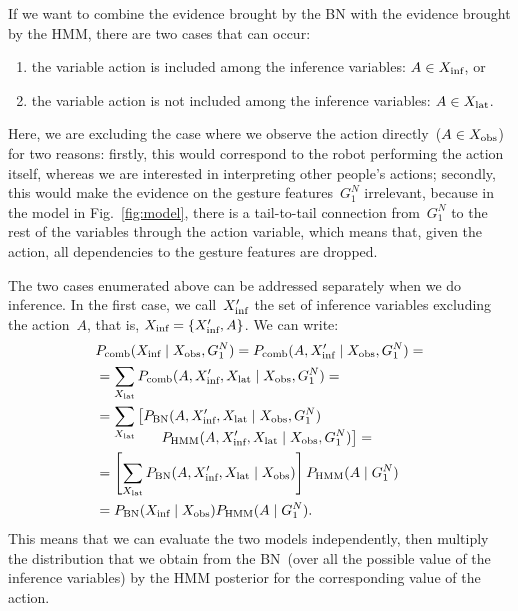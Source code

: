 If we want to combine the evidence brought by the \ac{BN} with the evidence brought by the \ac{HMM}, there are two cases that can occur:
\begin{enumerate}
\item the variable action is included among the inference variables: $A \in X_\text{inf}$, or

\item the variable action is not included among the inference variables: $A \in X_\text{lat}$.
\end{enumerate}

Here, we are excluding the case where we observe the action directly~($A\in X_\text{obs}$) for two reasons: firstly, this would correspond to the robot performing the action itself, whereas we are interested in interpreting other people's actions;
secondly, this would make the evidence on the gesture features~$G_1^N$ irrelevant, because in the model in Fig.~\ref{fig:model}, there is a tail-to-tail connection from~$G_1^N$ to the rest of the variables through the action variable, which means that, given the action, all dependencies to the gesture features are dropped.

The two cases enumerated above can be addressed separately when we do inference.
In the first case, we call~$X_\text{inf}^\prime$ the set of inference variables excluding the action~$A$, that is, $X_\text{inf} = \{X_\text{inf}^\prime, A\}$.
We can write:
\begin{align} \label{eq:fusion_excluding_action}
  & \pcomb(\xinf \given  \xobs, G_1^N) = \pcomb(A, \xinf^\prime \given  \xobs, G_1^N)= \nonumber \\
  &= \sum_{\xlat} \pcomb(A, \xinf^\prime, \xlat \given \xobs, G_1^N)= \nonumber\\
  &= \sum_{\xlat} \left[\pbn(A, \xinf^\prime, \xlat \given \xobs, G_1^N)\right. \nonumber \\[-4mm]
    & \mspace{80mu} \left.\phmm(A, \xinf^\prime, \xlat \given \xobs, G_1^N)\right]= \nonumber \\
  &= \left[\sum_{\xlat} \pbn(A, \xinf^\prime, \xlat \given \xobs)\right] \phmm(A \given G_1^N) \nonumber \\
  &= \pbn(\xinf \given \xobs) \phmm(A \given G_1^N).
\end{align}
This means that we can evaluate the two models independently, then multiply the distribution that we obtain from the \ac{BN}~(over all the possible value of the inference variables) by the \ac{HMM} posterior for the corresponding value of the action.

